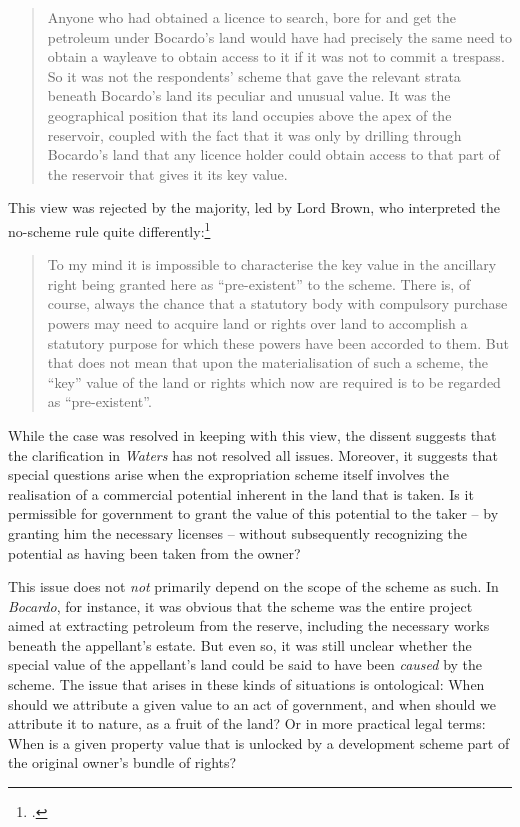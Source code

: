 \begin{quote}
Anyone who had obtained a licence to search, bore for and get the petroleum under Bocardo’s
land would have had precisely the same need to obtain a wayleave to obtain access
to it if it was not to commit a trespass. So it was not the respondents' scheme that
gave the relevant strata beneath Bocardo’s land its peculiar and unusual value. It
was the geographical position that its land occupies above the apex of the
reservoir, coupled with the fact that it was only by drilling through Bocardo’s land
that any licence holder could obtain access to that part of the reservoir that gives it
its key value.
\end{quote}

This view was rejected by the majority, led by Lord Brown, who interpreted the no-scheme rule quite differently:\footcite[83]{bocardo10}

\begin{quote}To my mind it is impossible to characterise the key value in the ancillary
right being granted here as ``pre-existent'' to the scheme. There is, of course,
always the chance that a statutory body with compulsory purchase powers may
need to acquire land or rights over land to accomplish a statutory purpose for
which these powers have been accorded to them. But that does not mean that upon
the materialisation of such a scheme, the ``key'' value of the land or rights which
now are required is to be regarded as “pre-existent”.
\end{quote}

While the case was resolved in keeping with this view, the dissent suggests that the clarification in \emph{Waters} has not resolved all issues. Moreover, it suggests that special questions arise when the expropriation scheme itself involves the realisation of a commercial potential inherent in the land that is taken. Is it permissible for government to grant the value of this potential to the taker -- by granting him the necessary licenses -- without subsequently recognizing the potential as having been taken from the owner? 

This issue does not \emph{not} primarily depend on the scope of the scheme as such. In {\it Bocardo}, for instance, it was obvious that the scheme was the entire project aimed at extracting petroleum from the reserve, including the necessary works beneath the appellant's estate. But even so, it was still unclear whether the special value of the appellant's land could be said to have been {\it caused} by the scheme. The issue that arises in these kinds of situations is ontological: When should we attribute a given value to an act of government, and when should we attribute it to nature, as a fruit of the land? Or in more practical legal terms: When is a given property value that is unlocked by a development scheme part of the original owner's bundle of rights?

